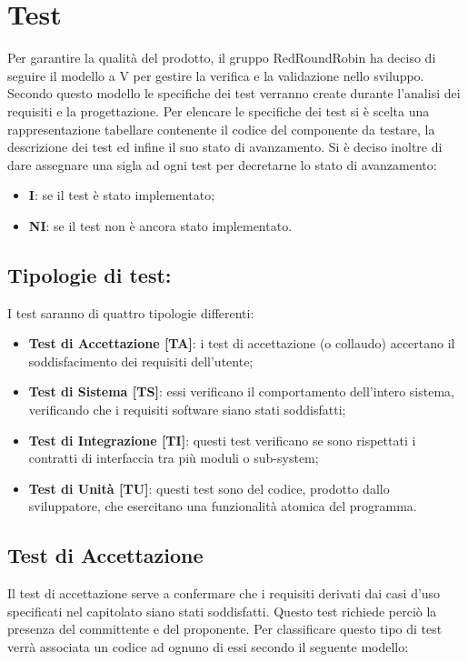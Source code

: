 \section{Test}
	Per garantire la qualità del prodotto, il gruppo RedRoundRobin ha deciso di seguire il modello a V per gestire la verifica e la validazione nello sviluppo. Secondo questo modello le specifiche dei test verranno create durante l'analisi dei requisiti e la progettazione.
	Per elencare le specifiche dei test si è scelta una rappresentazione tabellare contenente il codice del componente da testare, la descrizione dei test ed infine il suo stato di avanzamento.
	Si è deciso inoltre di dare assegnare una sigla ad ogni test per decretarne lo stato di avanzamento:
	\begin{itemize}
		\item \textbf{I}: se il test è stato implementato;
		\item \textbf{NI}: se il test non è ancora stato implementato.
	\end{itemize}

	\subsection{Tipologie di test:}
		I test saranno di quattro tipologie differenti:
		\begin{itemize}
			
			\item \textbf{Test di Accettazione [TA]}: i test di accettazione (o collaudo) accertano il soddisfacimento dei requisiti dell'utente;
			\item \textbf{Test di Sistema [TS]}: essi verificano il comportamento dell'intero sistema, verificando che i requisiti software siano stati soddisfatti;
			\item \textbf{Test di Integrazione [TI]}: questi test verificano se sono rispettati i contratti di interfaccia tra più moduli o sub-system;
			\item \textbf{Test di Unità [TU]}: questi test sono del codice, prodotto dallo sviluppatore, che esercitano una funzionalità atomica del programma.

		\end{itemize}

	\subsection{Test di Accettazione}
		Il test di accettazione serve a confermare che i requisiti derivati dai casi d'uso specificati nel capitolato siano stati soddisfatti. Questo test richiede perciò la presenza del committente e del proponente.  
		Per classificare questo tipo di test verrà associata un codice ad ognuno di essi secondo il seguente modello:
		

